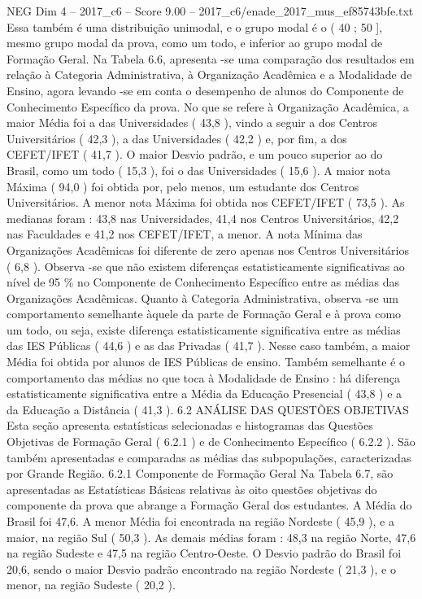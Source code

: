 \begin{textsample}{NEG Dim 4 – 2017\_c6 – Score 9.00 – 2017\_c6/enade\_2017\_mus\_ef85743bfe.txt}
Essa também é uma distribuição unimodal, e o grupo modal é o ( 40 ; 50 ], mesmo grupo modal da prova, como um todo, e inferior ao grupo modal de Formação Geral.
Na Tabela 6.6, apresenta -se uma comparação dos resultados em relação à Categoria Administrativa, à Organização Acadêmica e a Modalidade de Ensino, agora levando -se em conta o desempenho de alunos do Componente de Conhecimento Específico da prova.
No que se refere à Organização Acadêmica, a maior Média foi a das Universidades ( 43,8 ), vindo a seguir a dos Centros Universitários ( 42,3 ), a das Universidades ( 42,2 ) e, por fim, a dos CEFET/IFET ( 41,7 ).
O maior Desvio padrão, e um pouco superior ao do Brasil, como um todo ( 15,3 ), foi o das Universidades ( 15,6 ).
A maior nota Máxima ( 94,0 ) foi obtida por, pelo menos, um estudante dos Centros Universitários.
A menor nota Máxima foi obtida nos CEFET/IFET ( 73,5 ).
As medianas foram : 43,8 nas Universidades, 41,4 nos Centros Universitários, 42,2 nas Faculdades e 41,2 nos CEFET/IFET, a menor.
A nota Mínima das Organizações Acadêmicas foi diferente de zero apenas nos Centros Universitários ( 6,8 ).
Observa -se que não existem diferenças estatisticamente significativas ao nível de 95 \% no Componente de Conhecimento Específico entre as médias das Organizações Acadêmicas.
Quanto à Categoria Administrativa, observa -se um comportamento semelhante àquele da parte de Formação Geral e à prova como um todo, ou seja, existe diferença estatisticamente significativa entre as médias das IES Públicas ( 44,6 ) e as das Privadas ( 41,7 ).
Nesse caso também, a maior Média foi obtida por alunos de IES Públicas de ensino.
Também semelhante é o comportamento das médias no que toca à Modalidade de Ensino : há diferença estatisticamente significativa entre a Média da Educação Presencial ( 43,8 ) e a da Educação a Distância ( 41,3 ). 6.2 ANÁLISE DAS QUESTÕES OBJETIVAS Esta seção apresenta estatísticas selecionadas e histogramas das Questões Objetivas de Formação Geral ( 6.2.1 ) e de Conhecimento Específico ( 6.2.2 ).
São também apresentadas e comparadas as médias das subpopulações, caracterizadas por Grande Região. 6.2.1 Componente de Formação Geral Na Tabela 6.7, são apresentadas as Estatísticas Básicas relativas às oito questões objetivas do componente da prova que abrange a Formação Geral dos estudantes.
A Média do Brasil foi 47,6.
A menor Média foi encontrada na região Nordeste ( 45,9 ), e a maior, na região Sul ( 50,3 ).
As demais médias foram : 48,3 na região Norte, 47,6 na região Sudeste e 47,5 na região Centro-Oeste.
O Desvio padrão do Brasil foi 20,6, sendo o maior Desvio padrão encontrado na região Nordeste ( 21,3 ), e o menor, na região Sudeste ( 20,2 ).

\end{textsample}
